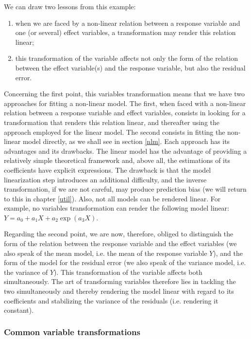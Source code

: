 We can draw two lessons from this example:
\begin{enumerate}
\item when we are faced by a non-linear relation between a response variable and one (or several) effect variables, a transformation may render this relation linear;
\item this transformation of the variable affects not only the form of the relation between the effect variable(s) and the response variable, but also the residual error.
\end{enumerate}
Concerning the first point, this variables transformation means that we have two approaches for fitting a non-linear model. The first, when faced with a non-linear relation between a response variable and effect variables, consists in looking for a transformation that renders this relation linear, and thereafter using the approach employed for the linear model. The second consists in fitting the non-linear model directly, as we shall see in section \ref{nlm}. Each approach has its advantages and its drawbacks. The linear model has the advantage of providing a relatively simple theoretical framework and, above all, the estimations of its coefficients have explicit expressions. The drawback is that the model linearization step introduces an additional difficulty, and the inverse transformation, if we are not careful, may produce prediction bias (we will return to this in chapter \ref{util}). Also, not all models can be rendered linear. For example, no variables transformation can render the following model linear: $Y=a_0+a_1X+a_2\exp(a_3X)$.

Regarding the second point, we are now, therefore, obliged to distinguish the form of the relation between the response variable and the effect variables (we also speak of the mean model, i.e. the mean of the response variable $Y$), and the form of the model for the residual error (we also speak of the variance model, i.e. the variance of $Y$). This transformation of the variable affects both simultaneously. The art of transforming variables therefore lies in tackling the two simultaneously and thereby rendering the model linear with regard to its coefficients and stabilizing the variance of the residuals (i.e. rendering it constant).

\subsubsection{Common variable transformations}

